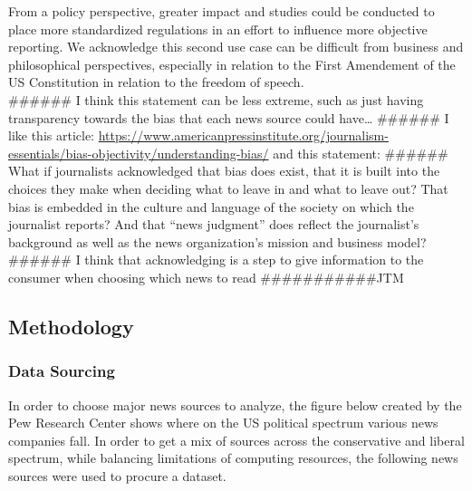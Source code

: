 \documentclass[
]{article}
\begin{document}
From a policy perspective, greater impact and studies could be conducted
to place more standardized regulations in an effort to influence more
objective reporting. We acknowledge this second use case can be
difficult from business and philosophical perspectives, especially in
relation to the First Amendement of the US Constitution in relation to
the freedom of speech.\\
\#\#\#\#\#\# I think this statement can be less extreme, such as just
having transparency towards the bias that each news source could
have\ldots{} \#\#\#\#\#\# I like this article:
\url{https://www.americanpressinstitute.org/journalism-essentials/bias-objectivity/understanding-bias/}
and this statement: \#\#\#\#\#\# What if journalists acknowledged that
bias does exist, that it is built into the choices they make when
deciding what to leave in and what to leave out? That bias is embedded
in the culture and language of the society on which the journalist
reports? And that ``news judgment'' does reflect the journalist's
background as well as the news organization's mission and business
model? \#\#\#\#\#\# I think that acknowledging is a step to give
information to the consumer when choosing which news to read
\#\#\#\#\#\#\#\#\#\#\#JTM

\hypertarget{methodology}{%
\subsection{Methodology}\label{methodology}}

\hypertarget{data-sourcing}{%
\subsubsection{Data Sourcing}\label{data-sourcing}}

In order to choose major news sources to analyze, the figure below
created by the Pew Research Center shows where on the US political
spectrum various news companies fall. In order to get a mix of sources
across the conservative and liberal spectrum, while balancing
limitations of computing resources, the following news sources were used
to procure a dataset.
\end{document}
